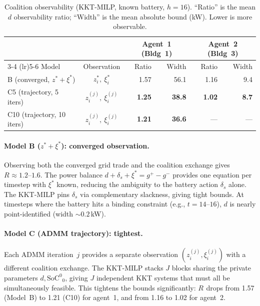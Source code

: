 \documentclass[11pt,a4paper]{article}
\newcommand{\deltas}{\delta_s}
\newcommand{\netload}{d}
\newcommand{\SoC}{{\text{SoC}^0}}
\newcommand{\ce}{\xi}
\newcommand{\ratio}[1]{R_{#1}}
\begin{document}
\begin{table}[ht]
\centering
\caption{Coalition observability (KKT-MILP, known battery, $h=16$). ``Ratio'' is the mean $\netload$ observability ratio; ``Width'' is the mean absolute bound (kW). Lower is more observable.}
\label{tab:coalition}
\small
\begin{tabular}{lc rr rr}
\toprule
& & \multicolumn{2}{c}{Agent~1 (Bldg~1)} & \multicolumn{2}{c}{Agent~2 (Bldg~3)} \\
\cmidrule(lr){3-4} \cmidrule(lr){5-6}
Model & Observation & Ratio & Width & Ratio & Width \\
\midrule
B (converged, $z^* + \ce^*$) & $z_i^*,\ \ce_i^*$ & 1.57 & 56.1 & 1.16 & 9.4 \\
C5 (trajectory, 5 iters) & $z_i^{(j)},\ \ce_i^{(j)}$ & \textbf{1.25} & \textbf{38.8} & \textbf{1.02} & \textbf{8.7} \\
C10 (trajectory, 10 iters) & $z_i^{(j)},\ \ce_i^{(j)}$ & \textbf{1.21} & \textbf{36.6} & --- & --- \\
\bottomrule
\end{tabular}
\end{table}

\paragraph{Model B ($z^* + \ce^*$): converged observation.}
Observing both the converged grid trade and the coalition exchange gives $\ratio{} \approx 1.2$--$1.6$. The power balance $\netload + \deltas + \ce^* = g^+ - g^-$ provides one equation per timestep with $\ce^*$ known, reducing the ambiguity to the battery action $\deltas$ alone. The KKT-MILP pins $\deltas$ via complementary slackness, giving tight bounds. At timesteps where the battery hits a binding constraint (e.g., $t=14$--$16$), $\netload$ is nearly point-identified (width $\sim 0.2$\,kW).

\paragraph{Model C (ADMM trajectory): tightest.}
Each ADMM iteration~$j$ provides a separate observation $(z_i^{(j)}, \ce_i^{(j)})$ with a different coalition exchange. The KKT-MILP stacks $J$ blocks sharing the private parameters $\netload, \SoC_0$, giving $J$ independent KKT systems that must all be simultaneously feasible. This tightens the bounds significantly: $\ratio{}$ drops from 1.57 (Model~B) to 1.21 (C10) for agent~1, and from 1.16 to 1.02 for agent~2.
\end{document}
